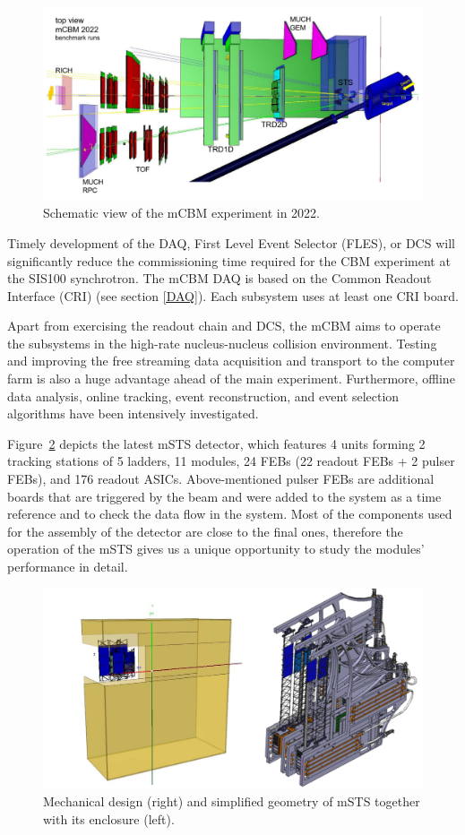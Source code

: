 \begin{figure}[!h]
\centering
\includegraphics[width=1\columnwidth]{Chapter6/DCS/images/mcbm_2021_setup.png}
\caption{Schematic view of the mCBM experiment in 2022.}
\label{fig_mcbm}
\end{figure}
\newpage
Timely development of the \gls{DAQ}, First Level Event Selector (\gls{FLES}), or \gls{DCS} will significantly reduce the commissioning time required for the \gls{CBM} experiment at the SIS100 synchrotron. The \gls{mCBM} \gls{DAQ} is based on the Common Readout Interface (\gls{CRI}) (see section \ref{DAQ}). Each subsystem uses at least one \gls{CRI} board. 

Apart from exercising the readout chain and \gls{DCS}, the \gls{mCBM} aims to operate the subsystems in the high-rate nucleus-nucleus collision environment. Testing and improving the free streaming data acquisition and transport to the computer farm is also a huge advantage ahead of the main experiment. Furthermore, offline data analysis, online tracking, event reconstruction, and event selection algorithms have been intensively investigated. 

Figure~\ref{fig_STS} depicts the latest \gls{mSTS} detector, which features \num{4} units forming \num{2} tracking stations of \num{5} ladders, \num{11} modules, \num{24} \glspl{FEB} (\num{22} readout \glspl{FEB} + \num{2} pulser \glspl{FEB}), and \num{176} readout \glspl{ASIC}. Above-mentioned pulser \glspl{FEB} are additional boards that are triggered by the beam and were added to the system as a time reference and to check the data flow in the system.  Most of the components used for the assembly of the detector are close to the final ones, therefore the operation of the \gls{mSTS} gives us a unique opportunity to study the modules' performance in detail.
\begin{figure}[!h]
\centering
\includegraphics[width=0.75\columnwidth]{Chapter6/DCS/images/mSTS_mech.png}
\caption{Mechanical design (right) and simplified geometry of \gls{mSTS} together with its enclosure (left).}
\label{fig_STS}
\end{figure}
\newpage
